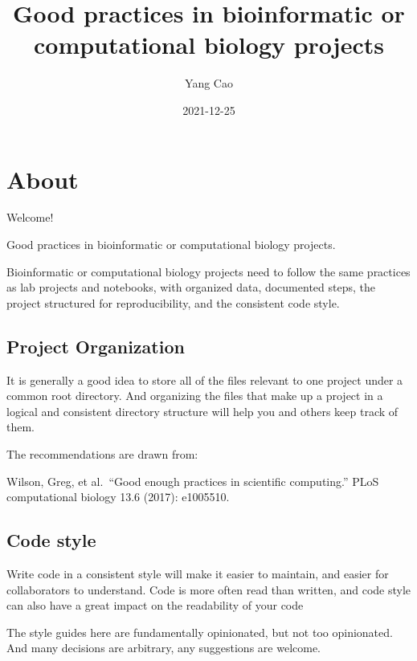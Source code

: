 \documentclass[
]{book}
\title{Good practices in bioinformatic or computational biology projects}
\author{Yang Cao}
\date{2021-12-25}
\begin{document}
\maketitle

{
\setcounter{tocdepth}{1}
\tableofcontents
}
\hypertarget{about}{%
\chapter*{About}\label{about}}

Welcome!

Good practices in bioinformatic or computational biology projects.

Bioinformatic or computational biology projects need to follow the same
practices as lab projects and notebooks, with organized data, documented steps,
the project structured for reproducibility, and the consistent code style.

\hypertarget{project-organization}{%
\section*{Project Organization}\label{project-organization}}

It is generally a good idea to store all of the files relevant to one project
under a common root directory. And organizing the files that make up a project
in a logical and consistent directory structure will help you and others keep
track of them.

The recommendations are drawn from:

Wilson, Greg, et al.~``Good enough practices in scientific computing.'' PLoS computational biology 13.6 (2017): e1005510.

\hypertarget{code-style}{%
\section*{Code style}\label{code-style}}

Write code in a consistent style will make it easier to maintain, and easier
for collaborators to understand. Code is more often read than written, and code
style can also have a great impact on the readability of your code

The style guides here are fundamentally opinionated, but not too opinionated.
And many decisions are arbitrary, any suggestions are welcome.
\end{document}
